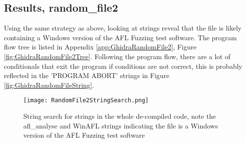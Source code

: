 \documentclass[
	letterpaper, %
	10pt, %
	unnumberedsections, %
	twoside, %
]{APAAssignment}
\begin{document}
\subsection{Results, random\_file2}
Using the same strategy as above, looking at strings reveal that the file is likely containing a Windows version of the AFL Fuzzing test software. The program flow tree is listed in Appendix \ref{app:GhidraRandomFile2}, Figure \ref{fig:GhidraRandomFile2Tree}. Following the program flow, there are a lot of conditionals that exit the program if conditions are not correct, this is probably reflected in the 'PROGRAM ABORT' strings in Figure \ref{fig:GhidraRandomFileString}.   
\begin{figure}[!htp] %
	\centering
	\texttt{[image: RandomFile2StringSearch.png]}
	\caption{String search for strings in the whole de-compiled code, note the afl\_analyse and WinAFL strings indicating the file is a Windows version of the AFL Fuzzing test software}
	\label{fig:GhidraRandomFile2StringSearch}
\end{figure}

\clearpage
\printbibliography %





\appendix


\clearpage
\end{document}
